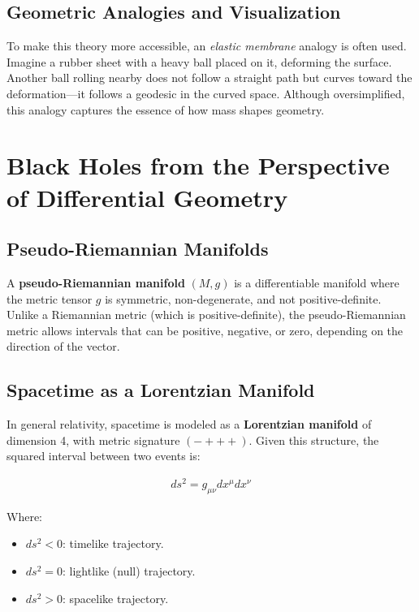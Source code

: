 \documentclass{aleph-revista}
\begin{document}
\subsection*{Geometric Analogies and Visualization}
To make this theory more accessible, an \textit{elastic membrane} analogy is often used. Imagine a rubber sheet with a heavy ball placed on it, deforming the surface. Another ball rolling nearby does not follow a straight path but curves toward the deformation—it follows a geodesic in the curved space. Although oversimplified, this analogy captures the essence of how mass shapes geometry.
\section{Black Holes from the Perspective of Differential Geometry}

\subsection{Pseudo-Riemannian Manifolds}

A \textbf{pseudo-Riemannian manifold} \((M, g)\) is a differentiable manifold where the metric tensor \(g\) is symmetric, non-degenerate, and not positive-definite. Unlike a Riemannian metric (which is positive-definite), the pseudo-Riemannian metric allows intervals that can be positive, negative, or zero, depending on the direction of the vector.

\subsection{Spacetime as a Lorentzian Manifold}

In general relativity, spacetime is modeled as a \textbf{Lorentzian manifold} of dimension 4, with metric signature \((-+++)\). Given this structure, the squared interval between two events is:

\begin{align*}
ds^2 = g_{\mu\nu} dx^\mu dx^\nu
\end{align*}

Where:
\begin{itemize}
  \item \(ds^2 < 0\): timelike trajectory.
  \item \(ds^2 = 0\): lightlike (null) trajectory.
  \item \(ds^2 > 0\): spacelike trajectory.
\end{itemize}
\end{document}
